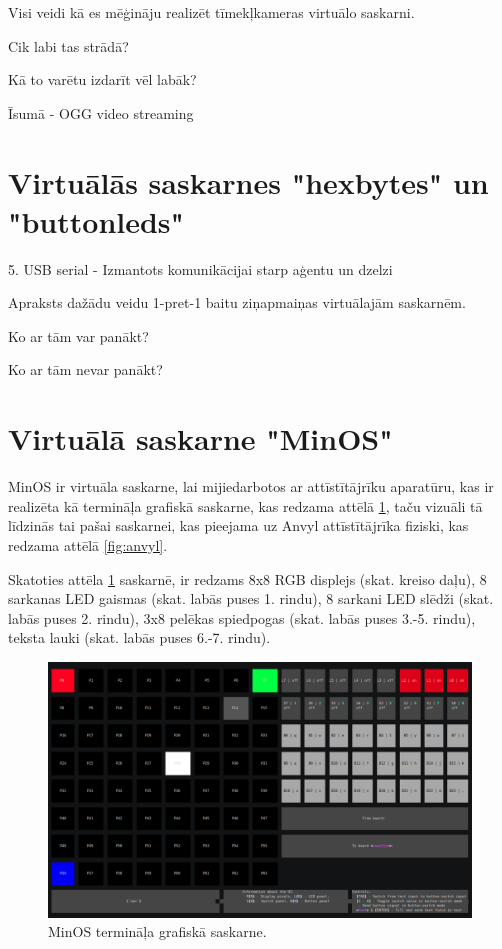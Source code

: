 Visi veidi kā es mēģināju realizēt tīmekļkameras virtuālo saskarni.

Cik labi tas strādā?

Kā to varētu izdarīt vēl labāk?

Īsumā - OGG video streaming

\section{Virtuālās saskarnes "hexbytes" un "buttonleds"}
\label{sec:vinbytes}

5. USB serial - Izmantots komunikācijai starp aģentu un dzelzi


Apraksts dažādu veidu 1-pret-1 baitu ziņapmaiņas virtuālajām saskarnēm.

Ko ar tām var panākt?

Ko ar tām nevar panākt?

\section{Virtuālā saskarne "MinOS"}
\label{sec:vinminos}

MinOS ir virtuāla saskarne, lai mijiedarbotos ar attīstītājrīku aparatūru, kas
ir realizēta kā termināļa grafiskā saskarne, kas redzama attēlā
\ref{fig:minosgui}, taču vizuāli tā līdzinās tai pašai saskarnei, kas pieejama
uz Anvyl attīstītājrīka fiziski, kas redzama attēlā \ref{fig:anvyl}. 

Skatoties attēla \ref{fig:minosgui} saskarnē, ir redzams 8x8 RGB displejs (skat.
kreiso daļu), 8 sarkanas LED gaismas (skat. labās puses 1. rindu), 8 sarkani LED
slēdži (skat. labās puses 2. rindu), 3x8 pelēkas spiedpogas (skat. labās puses
3.-5. rindu), teksta lauki (skat. labās puses 6.-7. rindu). 

\begin{figure}[H]
    \includegraphics[width=0.7\linewidth]{assets/min-os-execution.png}
    \centering
    \caption{MinOS termināļa grafiskā saskarne.}
    \label{fig:minosgui}
\end{figure}


